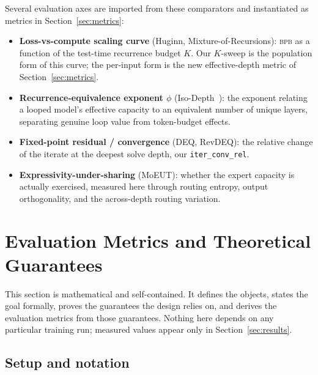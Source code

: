 \documentclass[11pt]{article}
\newcommand{\bpb}{\textsc{bpb}}
\newcommand{\code}[1]{\texttt{#1}}
\begin{document}
Several evaluation axes are imported from these comparators and instantiated as
metrics in Section~\ref{sec:metrics}:
\begin{itemize}[leftmargin=1.2em,itemsep=2pt]
  \item \textbf{Loss-vs-compute scaling curve} (Huginn, Mixture-of-Recursions): \bpb{}
    as a function of the test-time recurrence budget $K$.  Our $K$-sweep is the
    population form of this curve; the per-input form is the new effective-depth
    metric of Section~\ref{sec:metrics}.
  \item \textbf{Recurrence-equivalence exponent $\phi$} (Iso-Depth~\cite{isodepth}):
    the exponent relating a looped model's effective capacity to an equivalent number
    of unique layers, separating genuine loop value from token-budget effects.
  \item \textbf{Fixed-point residual / convergence} (DEQ, RevDEQ): the relative change
    of the iterate at the deepest solve depth, our \code{iter\_conv\_rel}.
  \item \textbf{Expressivity-under-sharing} (MoEUT): whether the expert capacity is
    actually exercised, measured here through routing entropy, output orthogonality,
    and the across-depth routing variation.
\end{itemize}

\section{Evaluation Metrics and Theoretical Guarantees}
\label{sec:theory}

This section is mathematical and self-contained.  It defines the objects, states the
goal formally, proves the guarantees the design relies on, and derives the evaluation
metrics from those guarantees.  Nothing here depends on any particular training run;
measured values appear only in Section~\ref{sec:results}.

\subsection{Setup and notation}
\label{sec:setup}
\end{document}
